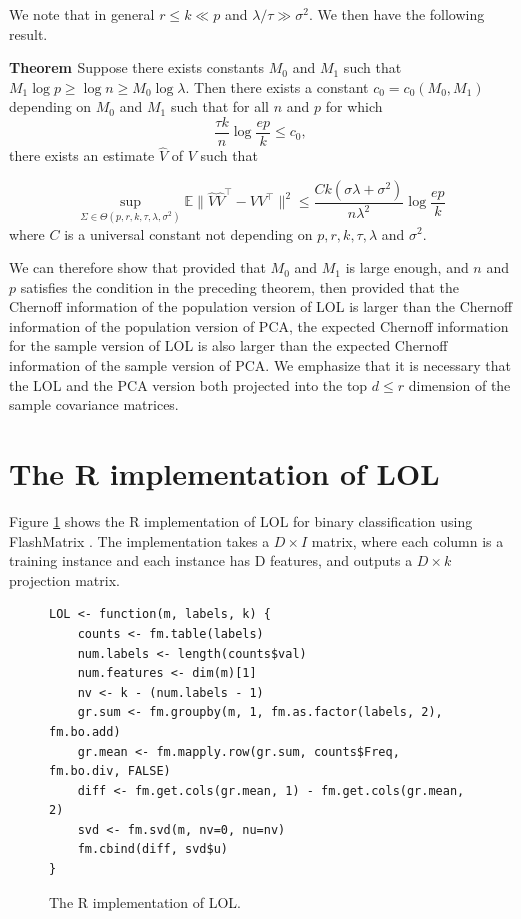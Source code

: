 \documentclass[10pt]{article}
\begin{document}
We note that in general $r \leq k \ll p$ and $\lambda/\tau \gg \sigma^2$. We then have the following result.

{\bf Theorem \cite{cai-pca-1}}
Suppose there exists constants $M_0$ and $M_1$ such that $M_1 \log p \geq \log n \geq M_0 \log \lambda$. Then there exists a constant $c_0 = c_0(M_0, M_1)$ depending on $M_0$ and $M_1$ such that for all $n$ and $p$ for which
$$ \frac{\tau k}{n} \log \frac{e p}{k} \leq c_0, $$ there exists an estimate $\hat{V}$ of $V$ such that

$$ \sup_{\Sigma \in \Theta(p,r,k,\tau,\lambda,\sigma^2)} \mathbb{E} \|\hat{V} \hat{V}^{\top} - V V^{\top} \|^{2} \leq \frac{C k (\sigma \lambda + \sigma^2)}{n \lambda^{2}} \log \frac{e p}{k}$$
where $C$ is a universal constant not depending on $p,r,k,\tau,\lambda$ and $\sigma^2$.

We can therefore show that provided that $M_0$ and $M_1$ is large enough, and $n$ and $p$ satisfies the condition in the preceding theorem, then provided that the Chernoff information of the population version of LOL is larger than the Chernoff information of the population version of PCA, the expected Chernoff information for the sample version of LOL is also larger than the expected Chernoff information of the sample version of PCA. We emphasize that it is necessary that the LOL and the PCA version both projected into the top $d \leq r$ dimension of the sample covariance matrices.





\clearpage
\section{The R implementation of LOL}

Figure \ref{Rimpl} shows the R implementation of LOL for binary classification
using FlashMatrix \cite{FlashMatrix}. The implementation takes a $D \times I$
matrix, where each column is a training instance and each instance has D
features, and outputs a $D \times k$ projection matrix.

\clearpage
\begin{figure}[t]
\begin{lstlisting}
LOL <- function(m, labels, k) {
	counts <- fm.table(labels)
	num.labels <- length(counts$val)
	num.features <- dim(m)[1]
	nv <- k - (num.labels - 1)
	gr.sum <- fm.groupby(m, 1, fm.as.factor(labels, 2), fm.bo.add)
	gr.mean <- fm.mapply.row(gr.sum, counts$Freq, fm.bo.div, FALSE)
	diff <- fm.get.cols(gr.mean, 1) - fm.get.cols(gr.mean, 2)
	svd <- fm.svd(m, nv=0, nu=nv)
	fm.cbind(diff, svd$u)
}
\end{lstlisting}
\caption{The R implementation of LOL.}
\label{Rimpl}
\end{figure}






\clearpage
% 


\end{document}
